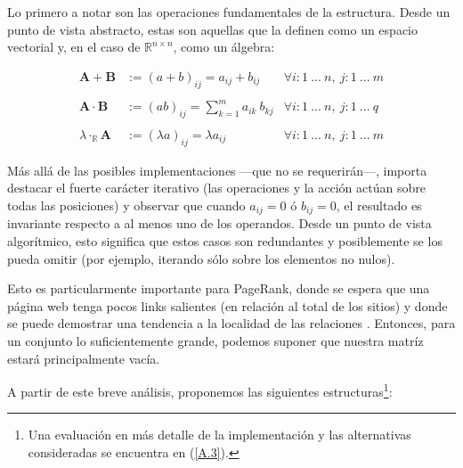 Lo primero a notar son las operaciones fundamentales de la estructura. Desde un punto de vista abstracto, estas son aquellas que la definen como un espacio vectorial y, en el caso de $\mathbb{R}^{n \times n}$, como un álgebra:
\vspace{1em}

\begin{align*}
    \mathbf{A} + \mathbf{B}     &:= (a + b)_{ij} = a_{ij} + b_{ij}                &   \forall i: 1\ ...\ n,\ j: 1\ ...\ m\\
    \\
    \mathbf{A} \cdot \mathbf{B} &:= (ab)_{ij} = \sum_{k=1}^{m} a_{ik}\ b_{kj}     &   \forall i: 1\ ...\ n,\ j: 1\ ...\ q\\ 
    \\
    \lambda \cdot_{\mathbb{R}} \mathbf{A}  &:= (\lambda a)_{ij} = \lambda a_{ij}  &   \forall i: 1\ ...\ n,\ j: 1\ ...\ m
\end{align*}
\vspace{1em}

Más allá de las posibles implementaciones ---que no se requerirán---, importa destacar el fuerte carácter iterativo (las operaciones y la acción actúan sobre todas las posiciones) y observar que cuando $a_{ij} = 0$ ó $b_{ij} = 0$, el resultado es invariante respecto a al menos uno de los operandos. Desde un punto de vista algorítmico, esto significa que estos casos son redundantes y posiblemente se los pueda omitir (por ejemplo, iterando sólo sobre los elementos no nulos).  
\vspace{1em}


Esto es particularmente importante para PageRank, donde se espera que una página web tenga pocos links salientes (en relación al total de los sitios) y donde se puede demostrar una tendencia a la localidad de las relaciones \cite{Langville04}. Entonces, para un conjunto lo suficientemente grande, podemos suponer que nuestra matríz estará principalmente vacía. 
\vspace{1em}

\noindent A partir de este breve análisis, proponemos las siguientes estructuras\footnote{Una evaluación en más detalle de la implementación y las alternativas consideradas se encuentra en (\ref{A.3}).}:
\vspace{1em}

